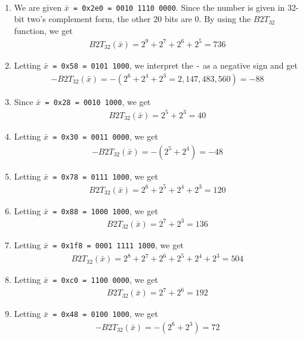 \documentclass[12pt]{article}
\newenvironment{sol}[1][Solution]{\begin{trivlist}
		\item[\hskip \labelsep {\bfseries #1:}]}{\end{trivlist}}
\begin{document}
\begin{sol}
	\
	\begin{enumerate}[label=(\Alph*)]
		\item We are given \texttt{\texttt{$\bar{x}$} = 0x2e0 = 0010 1110 0000}. Since the number
		is given in 32-bit two's complement form, the other 20 bits are 0. By using the $B2T_{32}$
		function, we get
		\begin{align*}
			B2T_{32}(\bar{x})=2^{9}+2^{7}+2^{6}+2^{5}=736
		\end{align*}
		\item Letting \texttt{$\bar{x}$ = 0x58 = 0101 1000}, we interpret the \texttt{-} as
		a negative sign and get
		\begin{align*}
			-B2T_{32}(\bar{x})=-\left(2^{6} + 2^{4} + 2^{3}=2,147,483,560\right)=-88
		\end{align*}
		\item Since \texttt{$\bar{x}$ = 0x28 = 0010 1000}, we get
		\begin{align*}
			B2T_{32}(\bar{x})=2^5+2^3=40
		\end{align*}
		\item Letting \texttt{$\bar{x}$ = 0x30 = 0011 0000}, we get
		\begin{align*}
			-B2T_{32}(\bar{x})=-\left(2^5+2^4\right) = -48
		\end{align*}
		\item Letting \texttt{$\bar{x}$ = 0x78 = 0111 1000}, we get
		\begin{align*}
			B2T_{32}(\bar{x})=2^6+2^5+2^4+2^3=120
		\end{align*}
		\item Letting \texttt{$\bar{x}$ = 0x88 = 1000 1000}, we get
		\begin{align*}
			B2T_{32}(\bar{x}) = 2^7 + 2^3 = 136
		\end{align*}
		\item Letting \texttt{$\bar{x}$ = 0x1f8 = 0001 1111 1000}, we get
		\begin{align*}
			B2T_{32}(\bar{x})=2^8 + 2^7 + 2^6 + 2^5 + 2^4 + 2^3 = 504
		\end{align*}
		\item Letting \texttt{$\bar{x}$ = 0xc0 = 1100 0000}, we get
		\begin{align*}
			B2T_{32}(\bar{x})=2^{7}+2^{6}=192
		\end{align*}
		\item Letting \texttt{$\bar{x}$ = 0x48 = 0100 1000}, we get
		\begin{align*}
			-B2T_{32}(\bar{x}) = -\left(2^6 + 2^3\right) = 72
		\end{align*}
	\end{enumerate}
\end{sol}
\end{document}
